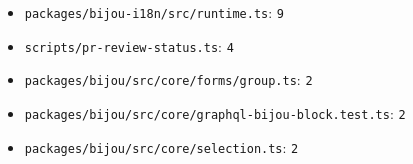 \begin{itemize}
\tightlist
\item
  \texttt{p\allowbreak{}a\allowbreak{}c\allowbreak{}k\allowbreak{}a\allowbreak{}g\allowbreak{}e\allowbreak{}s\allowbreak{}/\allowbreak{}b\allowbreak{}i\allowbreak{}j\allowbreak{}o\allowbreak{}u\allowbreak{}-\allowbreak{}i\allowbreak{}1\allowbreak{}8\allowbreak{}n\allowbreak{}/\allowbreak{}s\allowbreak{}r\allowbreak{}c\allowbreak{}/\allowbreak{}r\allowbreak{}u\allowbreak{}n\allowbreak{}t\allowbreak{}i\allowbreak{}m\allowbreak{}e\allowbreak{}.\allowbreak{}t\allowbreak{}s}: \texttt{9}
\item
  \texttt{s\allowbreak{}c\allowbreak{}r\allowbreak{}i\allowbreak{}p\allowbreak{}t\allowbreak{}s\allowbreak{}/\allowbreak{}p\allowbreak{}r\allowbreak{}-\allowbreak{}r\allowbreak{}e\allowbreak{}v\allowbreak{}i\allowbreak{}e\allowbreak{}w\allowbreak{}-\allowbreak{}s\allowbreak{}t\allowbreak{}a\allowbreak{}t\allowbreak{}u\allowbreak{}s\allowbreak{}.\allowbreak{}t\allowbreak{}s}: \texttt{4}
\item
  \texttt{p\allowbreak{}a\allowbreak{}c\allowbreak{}k\allowbreak{}a\allowbreak{}g\allowbreak{}e\allowbreak{}s\allowbreak{}/\allowbreak{}b\allowbreak{}i\allowbreak{}j\allowbreak{}o\allowbreak{}u\allowbreak{}/\allowbreak{}s\allowbreak{}r\allowbreak{}c\allowbreak{}/\allowbreak{}c\allowbreak{}o\allowbreak{}r\allowbreak{}e\allowbreak{}/\allowbreak{}f\allowbreak{}o\allowbreak{}r\allowbreak{}m\allowbreak{}s\allowbreak{}/\allowbreak{}g\allowbreak{}r\allowbreak{}o\allowbreak{}u\allowbreak{}p\allowbreak{}.\allowbreak{}t\allowbreak{}s}: \texttt{2}
\item
  \texttt{p\allowbreak{}a\allowbreak{}c\allowbreak{}k\allowbreak{}a\allowbreak{}g\allowbreak{}e\allowbreak{}s\allowbreak{}/\allowbreak{}b\allowbreak{}i\allowbreak{}j\allowbreak{}o\allowbreak{}u\allowbreak{}/\allowbreak{}s\allowbreak{}r\allowbreak{}c\allowbreak{}/\allowbreak{}c\allowbreak{}o\allowbreak{}r\allowbreak{}e\allowbreak{}/\allowbreak{}g\allowbreak{}r\allowbreak{}a\allowbreak{}p\allowbreak{}h\allowbreak{}q\allowbreak{}l\allowbreak{}-\allowbreak{}b\allowbreak{}i\allowbreak{}j\allowbreak{}o\allowbreak{}u\allowbreak{}-\allowbreak{}b\allowbreak{}l\allowbreak{}o\allowbreak{}c\allowbreak{}k\allowbreak{}.\allowbreak{}t\allowbreak{}e\allowbreak{}s\allowbreak{}t\allowbreak{}.\allowbreak{}t\allowbreak{}s}: \texttt{2}
\item
  \texttt{p\allowbreak{}a\allowbreak{}c\allowbreak{}k\allowbreak{}a\allowbreak{}g\allowbreak{}e\allowbreak{}s\allowbreak{}/\allowbreak{}b\allowbreak{}i\allowbreak{}j\allowbreak{}o\allowbreak{}u\allowbreak{}/\allowbreak{}s\allowbreak{}r\allowbreak{}c\allowbreak{}/\allowbreak{}c\allowbreak{}o\allowbreak{}r\allowbreak{}e\allowbreak{}/\allowbreak{}s\allowbreak{}e\allowbreak{}l\allowbreak{}e\allowbreak{}c\allowbreak{}t\allowbreak{}i\allowbreak{}o\allowbreak{}n\allowbreak{}.\allowbreak{}t\allowbreak{}s}: \texttt{2}

\end{itemize}
